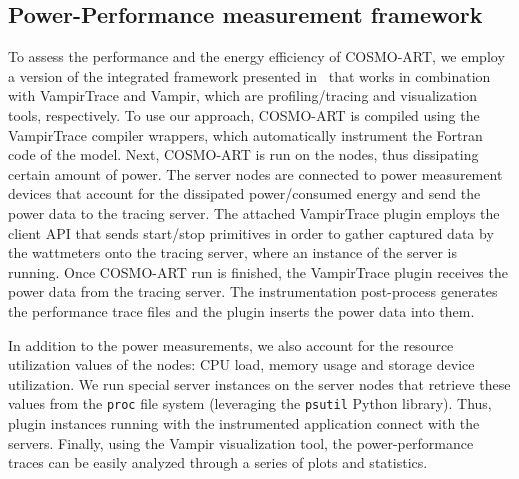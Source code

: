 \subsection{Power-Performance measurement framework}

To assess the performance and the energy efficiency of COSMO-ART,
we employ a version of the integrated framework presented in~\cite{energy13}
that works in combination with VampirTrace and Vampir, which are profiling/tracing
and visualization tools, respectively. 
To use our approach, COSMO-ART is compiled using the VampirTrace compiler wrappers, 
which automatically instrument the Fortran code of the model. Next, COSMO-ART 
is run on the nodes, thus dissipating certain amount of power.
The server nodes are connected to power measurement devices that account for
the dissipated power/consumed energy and send the power data to the tracing server.
The attached VampirTrace \pmlib plugin employs the client API that
sends start/stop primitives in order to gather captured data by the wattmeters onto
the tracing server, where an instance of the \pmlib server is running.
Once COSMO-ART run is finished, the VampirTrace \pmlib plugin
receives the power data from the tracing server.
The instrumentation post-process generates the performance trace files and the
\pmlib plugin inserts the power data into them.

In addition to the power measurements, we also account for the resource utilization
values of the nodes: CPU load, memory usage and storage device utilization. %
We run special \pmlib server instances on the server nodes
that retrieve these values from the \texttt{proc} file system (leveraging the \texttt{psutil} Python library).
Thus, \pmlib plugin instances running with the instrumented application
connect with the \pmlib servers. Finally, using the Vampir visualization tool, the power-performance traces
can be easily analyzed through a series of plots and statistics.
